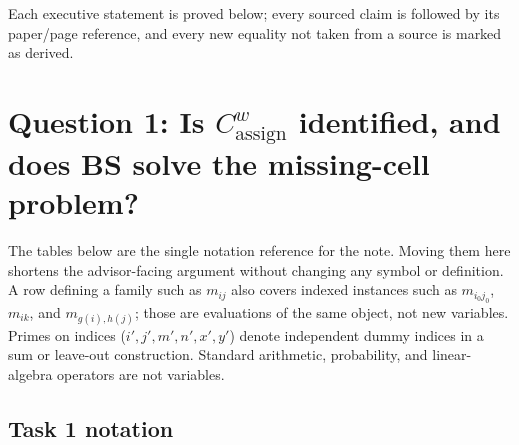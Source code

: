 \documentclass[11pt]{article}
\begin{document}
Each executive statement is proved below; every sourced claim is followed by
its paper/page reference, and every new equality not taken from a source is
marked as derived.

\section{Question 1: Is \(C^w_{\mathrm{assign}}\) identified, and does BS solve
the missing-cell problem?}


The tables below are the single notation reference for the note.  Moving them
here shortens the advisor-facing argument without changing any symbol or
definition.  A row defining a family such as \(m_{ij}\) also covers indexed
instances such as \(m_{i_0j_0}\), \(m_{ik}\), and
\(m_{g(i),h(j)}\); those are evaluations of the same object, not new
variables.  Primes on indices (\(i',j',m',n',x',y'\)) denote independent
dummy indices in a sum or leave-out construction.  Standard arithmetic,
probability, and linear-algebra operators are not variables.

\subsection{Task 1 notation}
\end{document}
